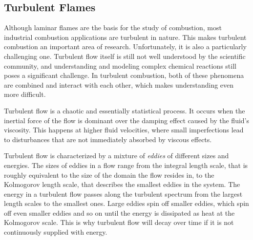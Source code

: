 \subsection{Turbulent Flames} %
\label{sub:turbulent_flames}
%
Although laminar flames are the basis for the study of combustion, most
industrial combustion applications are turbulent in nature.
%
This makes turbulent combustion an important area of research.
%
Unfortunately, it is also a particularly challenging one.
%
Turbulent flow itself is still not well understood by the scientific community,
and understanding and modeling complex chemical reactions still poses a
significant challenge.
%
In turbulent combustion, both of these phenomena are combined and interact with
each other, which makes understanding even more difficult.
%

%
Turbulent flow is a chaotic and essentially statistical process.
%
It occurs when the inertial force of the flow is dominant over the damping
effect caused by the fluid's viscosity.
%
This happens at higher fluid velocities, where small imperfections lead to
disturbances that are not immediately absorbed by viscous effects.
%

%
Turbulent flow is characterized by a mixture of \emph{eddies} of different sizes
and energies.
%
The sizes of eddies in a flow range from the integral length scale, that is
roughly equivalent to the size of the domain the flow resides in, to the
Kolmogorov length scale, that describes the smallest eddies in the system.
%
The energy in a turbulent flow passes along the turbulent spectrum from the
largest length scales to the smallest ones.
%
Large eddies spin off smaller eddies, which spin off even smaller eddies and so
on until the energy is dissipated as heat at the Kolmogorov scale.
%
This is why turbulent flow will decay over time if it is not continuously
supplied with energy.
%


